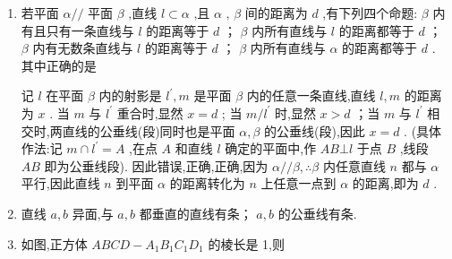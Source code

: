 \begin{enumerate}
\begin{jieda}
        \ps 本题的关键是构造出辅助平面 $\alpha$ .
    \end{jieda}
    \item 若平面 $\alpha //$ 平面 $\beta$ ,直线 $l \subset  \alpha$ ,且 $\alpha$ , $\beta$ 间的距离为 $d$ ,有下列四个命题: $\beta$ 内有且只有一条直线与 $l$ 的距离等于 $d$ ； $\beta$ 内所有直线与 $l$ 的距离都等于 $d$ ； $\beta$ 内有无数条直线与 $l$ 的距离等于 $d$ ； $\beta$ 内所有直线与 $\alpha$ 的距离都等于 $d$ . 其中正确的是 
    \begin{jieda}
        记 $l$ 在平面 $\beta$ 内的射影是 ${l}^{\prime },m$ 是平面 $\beta$ 内的任意一条直线,直线 $l,m$ 的距离为 $x$ . 当 $m$ 与 ${l}^{\prime }$ 重合时,显然 $x = d$ ; 当 $m/{l}^{\prime }$ 时,显然 $x > d$ ；当 $m$ 与 ${l}^{\prime }$ 相交时,两直线的公垂线(段)同时也是平面 $\alpha ,\beta$ 的公垂线(段),因此 $x = d$ . (具体作法:记 $m \cap  {l}^{\prime } = A$ ,在点 $A$ 和直线 $l$ 确定的平面中,作 ${AB}\bot l$ 于点 $B$ ,线段 ${AB}$ 即为公垂线段). 因此错误,正确,正确,因为 $\alpha //\beta ,\therefore \beta$ 内任意直线 $n$ 都与 $\alpha$ 平行,因此直线 $n$ 到平面 $\alpha$ 的距离转化为 $n$ 上任意一点到 $\alpha$ 的距离,即为 $d$ .
    \end{jieda}
    \item 直线 $a,b$ 异面,与 $a,b$ 都垂直的直线有条； $a,b$ 的公垂线有条.
    
    \item 如图,正方体 ${ABCD} - {A}_{1}{B}_{1}{C}_{1}{D}_{1}$ 的棱长是 1,则
    

\end{enumerate}

